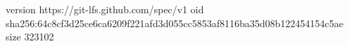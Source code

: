version https://git-lfs.github.com/spec/v1
oid sha256:64c8cf3d25ce6ca6209f221afd3d055cc5853af8116ba35d08b122454154c5ae
size 323102
